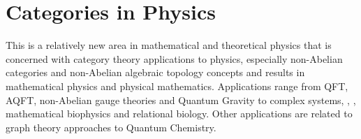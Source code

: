 \documentclass[12pt]{article}
\theoremstyle{plain}
\theoremstyle{definition}
\numberwithin{equation}{section}
\begin{document}
\section{Categories in Physics}

 This is a relatively new area in mathematical and theoretical physics that is concerned with category theory applications to physics, especially non-Abelian
categories and non-Abelian algebraic topology concepts and results in mathematical physics and physical mathematics. Applications range from QFT,
AQFT, non-Abelian gauge theories and Quantum Gravity to complex systems, 
, 
, mathematical biophysics and relational biology. Other applications are related to graph theory approaches to Quantum Chemistry. 
\end{document}
